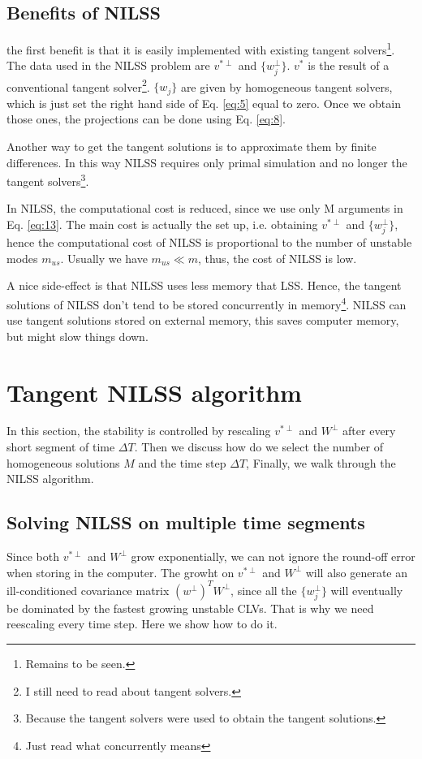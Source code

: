 \documentclass[10pt,twoside,a4paper]{article} %
\begin{document}
\subsection{Benefits of NILSS}\label{3.5}
the first benefit is that it is easily implemented with existing tangent solvers\footnote{Remains to be seen.}. The data used in the NILSS problem are $v^{*\perp}$ and $\{ w_j^\perp \}$. $v^*$ is the result of a conventional tangent solver\footnote{I still need to read about tangent solvers.}. $\{ w_j \}$ are given by homogeneous tangent solvers, which is just set the right hand side of Eq. \ref{eq:5} equal to zero. Once we obtain those ones, the projections can be done using Eq. \ref{eq:8}.

Another way to get the tangent solutions is to approximate them by finite differences. In this way NILSS requires only primal simulation and no longer the tangent solvers\footnote{Because the tangent solvers were used to obtain the tangent solutions.}.

In NILSS, the computational cost is reduced, since we use only M arguments in Eq. \ref{eq:13}. The main cost is actually the set up, i.e. obtaining $v^{*\perp}$ and $\{ w_j^\perp \}$, hence the computational cost of NILSS is proportional to the number of unstable modes $m_{us}$. Usually we have $m_{us} \ll m$, thus, the cost of NILSS is low.

A nice side-effect is that NILSS uses less memory that LSS. Hence, the tangent solutions of NILSS don't tend to be stored concurrently in memory\footnote{Just read what concurrently means}. NILSS can use tangent solutions stored on external memory, this saves computer memory, but might slow things down.

\section{Tangent NILSS algorithm}

In this section, the stability is controlled by rescaling $v^{*\perp}$ and $W^\perp$ after every short segment of time $\Delta T$. Then we discuss how do we select the number of homogeneous solutions $M$ and the time step $\Delta T$, Finally, we walk through the NILSS algorithm.

\subsection{Solving NILSS on multiple time segments}

Since both $v^{*\perp}$ and $W^\perp$ grow exponentially, we can not ignore the round-off error when storing in the computer. The growht on $v^{*\perp}$ and $W^\perp$ will also generate an ill-conditioned covariance matrix $(w^\perp)^T W^\perp$, since all the $\{w_j^\perp\}$ will eventually be dominated by the fastest growing unstable CLVs. That is why we need reescaling every time step. Here we show how to do it.
\end{document}
